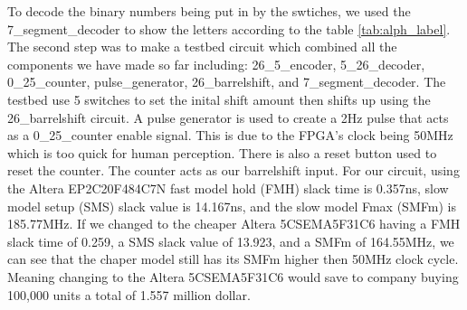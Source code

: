 \documentclass[10pt]{article}
\begin{document}
To decode the binary numbers being put in by the swtiches, we used the 7\_segment\_decoder to show the letters according to the table \ref{tab:alph_label}.
The second step was to make a testbed circuit which combined all the components we have made so far including: 26\_5\_encoder, 5\_26\_decoder, 0\_25\_counter, pulse\_generator, 26\_barrelshift, and 7\_segment\_decoder. The testbed use 5 switches to set the inital shift amount then shifts up using the 26\_barrelshift circuit. A pulse generator is used to create a 2Hz pulse that acts as a 0\_25\_counter enable signal. This is due to the FPGA's clock being 50MHz which is too quick for human perception. There is also a reset button used to reset the counter. The counter acts as our barrelshift input.
For our circuit, using the Altera EP2C20F484C7N fast model hold (FMH) slack time is 0.357ns, slow model setup (SMS) slack value is 14.167ns, and the slow model Fmax (SMFm) is 185.77MHz. If we changed to the cheaper Altera 5CSEMA5F31C6 having a FMH slack time of 0.259, a SMS slack value of 13.923, and a SMFm of 164.55MHz, we can see that the chaper model still has its SMFm higher then 50MHz clock cycle. Meaning changing to the Altera 5CSEMA5F31C6 would save to company buying 100,000 units a total of 1.557 million dollar.
\end{document}
